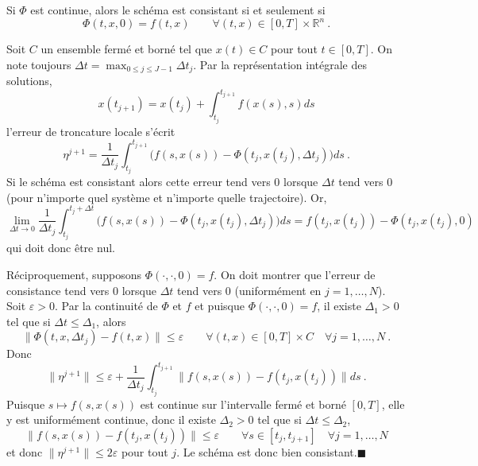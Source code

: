 \hypertarget{ed2-theo_CS_consistance}{}
\begin{theoreme}\label{ed2-theo_CS_consistance}
Si \(\Phi\) est continue, alors le schéma est consistant si et seulement
si \[
\Phi(t,x,0) = f(t,x) \qquad \forall (t,x)\in \left[ 0,T \right]\times \mathbb{R}^n \ .
\]
\end{theoreme}

\hypertarget{ed2-duxe9monstration}{}
\begin{preuve}\label{ed2-duxe9monstration}
Soit \(C\) un ensemble fermé et borné tel que \(x(t)\in C\) pour tout
\(t\in \left[ 0,T \right]\). On note toujours
\({\Delta t}= \max_{0\le j\le J-1} {\Delta t}_j\). Par la représentation
intégrale des solutions, \[
x(t_{j+1}) = x(t_j) + \int_{t_j}^{t_{j+1}} f(x(s),s)ds
\] l'erreur de troncature locale s'écrit \[
\eta^{j+1} = \frac{1}{{\Delta t}_j}  \int_{t_j}^{t_{j+1}} \Big( f(s,x(s)) - \Phi(t_j,x(t_j),{\Delta t}_j) \Big)ds \ .
\] Si le schéma est consistant alors cette erreur tend vers 0 lorsque
\({\Delta t}\) tend vers 0 (pour n'importe quel système et n'importe
quelle trajectoire). Or, \[
\lim_{{\Delta t}\to 0} \frac{1}{{\Delta t}_j}  \int_{t_j}^{t_j+{\Delta t}} \Big( f(s,x(s)) - \Phi(t_j,x(t_j),{\Delta t}_j) \Big)ds = f(t_j,x(t_j)) - \Phi(t_j,x(t_j),0)
\] qui doit donc être nul.

Réciproquement, supposons \(\Phi(\cdot,\cdot,0)=f\). On doit montrer que
l'erreur de consistance tend vers 0 lorsque \({\Delta t}\) tend vers 0
(uniformément en \(j=1,\hdots,N\)). Soit \(\varepsilon >0\). Par la
continuité de \(\Phi\) et \(f\) et puisque \(\Phi(\cdot,\cdot,0)=f\), il
existe \(\Delta_1 >0\) tel que si \({\Delta t}\leq \Delta_1\), alors \[
\|\Phi(t,x,{\Delta t}_j) -f(t,x) \| \leq \varepsilon \qquad \forall (t,x) \in \left[ 0,T \right]\times C \quad \forall j=1,\hdots,N \ .
\] Donc \[
\|\eta^{j+1}\| \leq  \varepsilon + \frac{1}{{\Delta t}_j}  \int_{t_j}^{t_{j+1}} \big\| f(s,x(s)) - f(t_j,x(t_j)) \big\|ds \ .
\] Puisque \(s\mapsto f(s,x(s))\) est continue sur l'intervalle fermé et
borné \(\left[ 0,T \right]\), elle y est uniformément continue, donc il
existe \(\Delta_2 >0\) tel que si \({\Delta t}\leq \Delta_2\), \[
\big\| f(s,x(s)) - f(t_j,x(t_j)) \big\| \leq \varepsilon \qquad \forall s \in \left[ t_j,t_{j+1} \right]\quad \forall j=1,\hdots,N
\] et donc \(\|\eta^{j+1}\|\leq 2 \varepsilon\) pour tout \(j\). Le
schéma est donc bien consistant.\hfill$\blacksquare$
\end{preuve}

